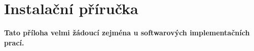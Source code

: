 \chapter{Instalační příručka}
\textbf{\large Tato příloha velmi žádoucí zejména u softwarových implementačních prací.}
